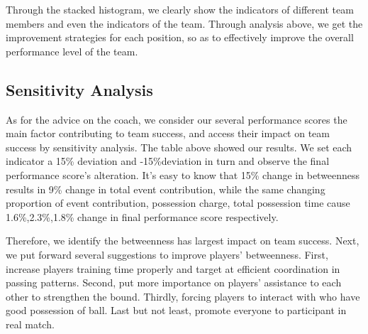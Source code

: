 \documentclass{mcmthesis}
\begin{document}
{Through the stacked histogram, we clearly show the indicators of different team members and even the indicators of the team. Through analysis above, we get the improvement strategies for each position, so as to effectively improve the overall performance level of the team.


\subsection{Sensitivity Analysis}



As for the advice on the coach, we consider our several performance scores the main factor contributing to team success, and access their impact on team success by sensitivity analysis.
The table above showed our results. We set each indicator a 15\% deviation and -15\%deviation in turn and observe the final performance score’s alteration.  It’s easy to know that 15\% change in betweenness results in 9\% change in total event contribution, while the same changing proportion of event contribution, possession charge, total possession time cause 1.6\%,2.3\%,1.8\% change in final performance score respectively.

Therefore, we identify the betweenness has largest impact on team success.
Next, we put forward several suggestions to improve players’ betweenness. First, increase players training time properly and target at efficient coordination in passing patterns. Second, put more importance on players’ assistance to each other to strengthen the bound. Thirdly, forcing players to interact with who have good possession of ball. Last but not least, promote everyone to participant in real match.

}
\end{document}
